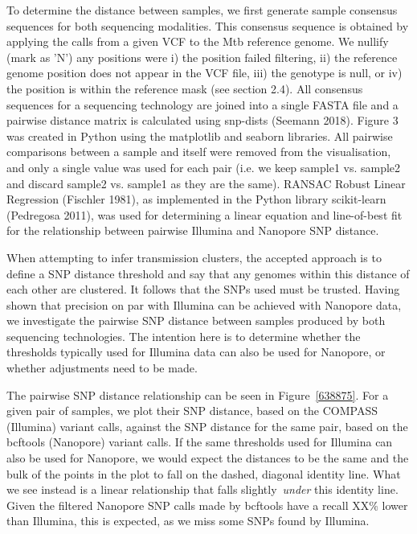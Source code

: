 To determine the distance between samples, we first generate sample consensus sequences for both sequencing modalities. This consensus sequence is obtained by applying the calls from a given VCF to the Mtb reference genome. We nullify (mark as 'N') any positions were i) the position failed filtering, ii) the reference genome position does not appear in the VCF file, iii) the genotype is null, or iv) the position is within the reference mask (see section 2.4). All consensus sequences for a sequencing technology are joined into a single FASTA file and a pairwise distance matrix is calculated using snp-dists (Seemann 2018).
Figure 3 was created in Python using the matplotlib and seaborn libraries. All pairwise comparisons between a sample and itself were removed from the visualisation, and only a single value was used for each pair (i.e. we keep sample1 vs. sample2 and discard sample2 vs. sample1 as they are the same). RANSAC Robust Linear Regression (Fischler 1981), as implemented in the Python library scikit-learn (Pedregosa 2011), was used for determining a linear equation and line-of-best fit for the relationship between pairwise Illumina and Nanopore SNP distance.

When attempting to infer transmission clusters, the accepted approach is
to define a SNP distance threshold and say that any genomes within this
distance of each other are clustered. It follows that the SNPs used must
be trusted. Having shown that precision on par with Illumina can be
achieved with Nanopore data, we investigate the pairwise SNP distance
between samples produced by both sequencing technologies. The intention
here is to determine whether the thresholds typically used for Illumina
data can also be used for Nanopore, or whether adjustments need to be
made.

The pairwise SNP distance relationship can be seen in
Figure~{\ref{638875}}. For a given pair of samples, we
plot their SNP distance, based on the COMPASS (Illumina) variant calls,
against the SNP distance for the same pair, based on the bcftools
(Nanopore) variant calls. If the same thresholds used for Illumina can
also be used for Nanopore, we would expect the distances to be the same
and the bulk of the points in the plot to fall on the dashed, diagonal
identity line. What we see instead is a linear relationship that falls
slightly~\emph{under} this identity line. Given the filtered Nanopore
SNP calls made by bcftools have a recall XX\% lower than Illumina, this
is expected, as we miss some SNPs found by Illumina.

